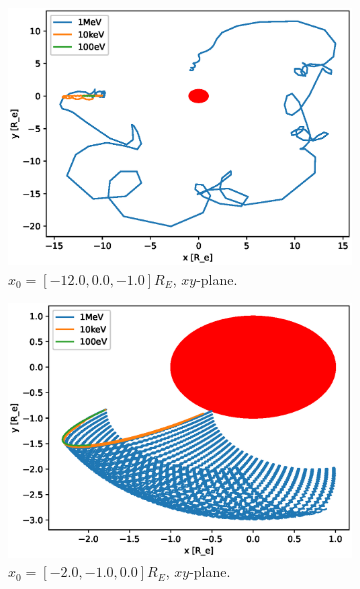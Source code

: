 \begin{figure}
    \begin{subfigure}[h]{0.45\textwidth}
        \includegraphics[width=\textwidth]{Figures/Trajectories/trajectories-xy-43.eps}
        \caption{$x_0 = [-12.0,0.0,-1.0]R_E$, $xy$-plane.}
        \label{fig:traj-a}
    \end{subfigure}
    \hfill
    \begin{subfigure}[h]{0.45\textwidth}
        \includegraphics[width=\textwidth]{Figures/Trajectories/trajectories-xy-11.eps}
        \caption{$x_0 = [-2.0,-1.0,0.0]R_E$, $xy$-plane.}
        \label{fig:traj-b}
    \end{subfigure}
    \vfill
    \begin{subfigure}[h]{0.45\textwidth}

\end{subfigure}
\end{figure}
